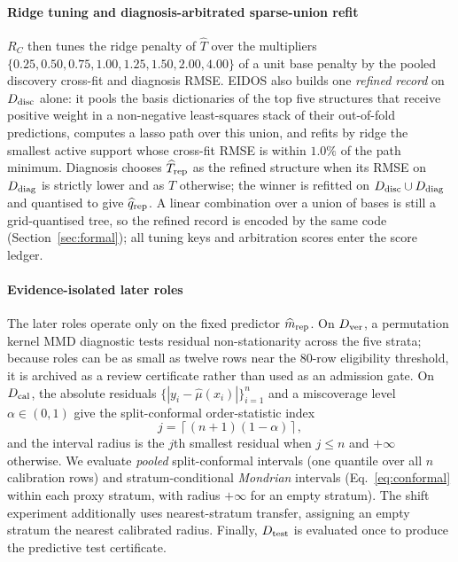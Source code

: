\paragraph{Ridge tuning and diagnosis-arbitrated sparse-union refit} \(R_C\) then tunes the ridge penalty of \(\widehat T\) over the multipliers \(\{0.25,0.50,0.75,1.00,\allowbreak 1.25,1.50,2.00,4.00\}\) of a unit base penalty by the pooled discovery cross-fit and diagnosis RMSE. EIDOS also builds one \emph{refined record} on \(D_{\rm disc}\) alone: it pools the basis dictionaries of the top five structures that receive positive weight in a non-negative least-squares stack of their out-of-fold predictions, computes a lasso path over this union, and refits by ridge the smallest active support whose cross-fit RMSE is within \(1.0\%\) of the path minimum. Diagnosis chooses \(\widehat T_{\rm rep}\) as the refined structure when its RMSE on \(D_{\rm diag}\) is strictly lower and as \(\widehat T\) otherwise; the winner is refitted on \(D_{\rm disc}\cup D_{\rm diag}\) and quantised to give \(\widehat q_{\rm rep}\). A linear combination over a union of bases is still a grid-quantised tree, so the refined record is encoded by the same code (Section~\ref{sec:formal}); all tuning keys and arbitration scores enter the score ledger.

\paragraph{Evidence-isolated later roles} The later roles operate only on the fixed predictor \(\widehat m_{\rm rep}\). On \(D_{\rm ver}\), a permutation kernel MMD diagnostic \citep{gretton2012mmd} tests residual non-stationarity across the five strata; because roles can be as small as twelve rows near the 80-row eligibility threshold, it is archived as a review certificate rather than used as an admission gate. On \(D_{\rm cal}\), the absolute residuals \(\{|y_i-\widehat\mu(x_i)|\}_{i=1}^n\) and a miscoverage level \(\alpha\in(0,1)\) give the split-conformal order-statistic index
\begin{equation}\label{eq:conformal}
j=\left\lceil(n+1)(1-\alpha)\right\rceil,
\end{equation}
and the interval radius is the \(j\)th smallest residual when \(j\le n\) and \(+\infty\) otherwise. We evaluate \emph{pooled} split-conformal intervals (one quantile over all \(n\) calibration rows) and stratum-conditional \emph{Mondrian} intervals \citep{vovk2005alrw} (Eq.~\eqref{eq:conformal} within each proxy stratum, with radius \(+\infty\) for an empty stratum). The shift experiment additionally uses nearest-stratum transfer, assigning an empty stratum the nearest calibrated radius. Finally, \(D_{\rm test}\) is evaluated once to produce the predictive test certificate.

